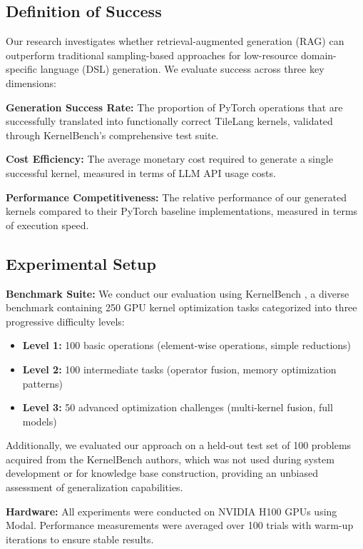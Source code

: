 \documentclass{article}
\begin{document}
\subsection{Definition of Success}

Our research investigates whether retrieval-augmented generation (RAG) can outperform traditional sampling-based approaches for low-resource domain-specific language (DSL) generation. We evaluate success across three key dimensions:

\textbf{Generation Success Rate:} The proportion of PyTorch operations that are successfully translated into functionally correct TileLang kernels, validated through KernelBench's \cite{ouyang2025kernelbenchllmswriteefficient} comprehensive test suite.

\textbf{Cost Efficiency:} The average monetary cost required to generate a single successful kernel, measured in terms of LLM API usage costs.

\textbf{Performance Competitiveness:} The relative performance of our generated kernels compared to their PyTorch baseline implementations, measured in terms of execution speed.

\subsection{Experimental Setup}

\textbf{Benchmark Suite:} We conduct our evaluation using KernelBench \cite{ouyang2025kernelbenchllmswriteefficient}, a diverse benchmark containing 250 GPU kernel optimization tasks categorized into three progressive difficulty levels:
\begin{itemize}
\item \textbf{Level 1:} 100 basic operations (element-wise operations, simple reductions)
\item \textbf{Level 2:} 100 intermediate tasks (operator fusion, memory optimization patterns)
\item \textbf{Level 3:} 50 advanced optimization challenges (multi-kernel fusion, full models)
\end{itemize}

Additionally, we evaluated our approach on a held-out test set of 100 problems acquired from the KernelBench authors, which was not used during system development or for knowledge base construction, providing an unbiased assessment of generalization capabilities.

\textbf{Hardware:} All experiments were conducted on NVIDIA H100 GPUs using Modal. Performance measurements were averaged over 100 trials with warm-up iterations to ensure stable results.
\end{document}
